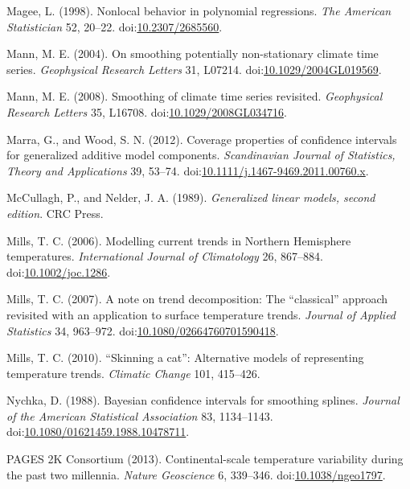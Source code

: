 \documentclass[12pt,]{article}
\begin{document}
\hypertarget{ref-Magee1998-oq}{}
Magee, L. (1998). Nonlocal behavior in polynomial regressions. \emph{The
American Statistician} 52, 20--22.
doi:\href{https://doi.org/10.2307/2685560}{10.2307/2685560}.

\hypertarget{ref-Mann2004-kd}{}
Mann, M. E. (2004). On smoothing potentially non-stationary climate time
series. \emph{Geophysical Research Letters} 31, L07214.
doi:\href{https://doi.org/10.1029/2004GL019569}{10.1029/2004GL019569}.

\hypertarget{ref-Mann2008-yk}{}
Mann, M. E. (2008). Smoothing of climate time series revisited.
\emph{Geophysical Research Letters} 35, L16708.
doi:\href{https://doi.org/10.1029/2008GL034716}{10.1029/2008GL034716}.

\hypertarget{ref-Marra2012-bq}{}
Marra, G., and Wood, S. N. (2012). Coverage properties of confidence
intervals for generalized additive model components. \emph{Scandinavian
Journal of Statistics, Theory and Applications} 39, 53--74.
doi:\href{https://doi.org/10.1111/j.1467-9469.2011.00760.x}{10.1111/j.1467-9469.2011.00760.x}.

\hypertarget{ref-McCullagh1989-gv}{}
McCullagh, P., and Nelder, J. A. (1989). \emph{Generalized linear
models, second edition}. CRC Press.

\hypertarget{ref-Mills2006-rb}{}
Mills, T. C. (2006). Modelling current trends in Northern Hemisphere
temperatures. \emph{International Journal of Climatology} 26, 867--884.
doi:\href{https://doi.org/10.1002/joc.1286}{10.1002/joc.1286}.

\hypertarget{ref-Mills2007-pq}{}
Mills, T. C. (2007). A note on trend decomposition: The ``classical''
approach revisited with an application to surface temperature trends.
\emph{Journal of Applied Statistics} 34, 963--972.
doi:\href{https://doi.org/10.1080/02664760701590418}{10.1080/02664760701590418}.

\hypertarget{ref-Mills2010-oe}{}
Mills, T. C. (2010). ``Skinning a cat'': Alternative models of
representing temperature trends. \emph{Climatic Change} 101, 415--426.

\hypertarget{ref-Nychka1988-rz}{}
Nychka, D. (1988). Bayesian confidence intervals for smoothing splines.
\emph{Journal of the American Statistical Association} 83, 1134--1143.
doi:\href{https://doi.org/10.1080/01621459.1988.10478711}{10.1080/01621459.1988.10478711}.

\hypertarget{ref-PAGES_2k_Consortium2013-fm}{}
PAGES 2K Consortium (2013). Continental-scale temperature variability
during the past two millennia. \emph{Nature Geoscience} 6, 339--346.
doi:\href{https://doi.org/10.1038/ngeo1797}{10.1038/ngeo1797}.
\end{document}
